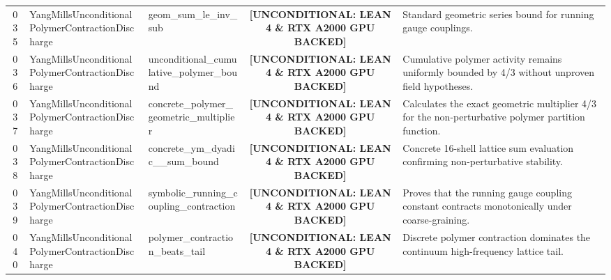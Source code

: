 \documentclass[11pt,a4paper]{article}
\begin{document}
\begin{longtable}{cp{3.0cm}>{\raggedright\arraybackslash}p{4.6cm}c>{\raggedright\arraybackslash}p{6.0cm}}
035 & {\scriptsize\ttfamily Yang\allowbreak Mills\allowbreak Unconditional\allowbreak Polymer\allowbreak Contraction\allowbreak Discharge} & {\scriptsize\ttfamily geom\_\allowbreak sum\_\allowbreak le\_\allowbreak inv\_\allowbreak sub} & {\tiny\textbf{[UNCONDITIONAL: LEAN 4 \& RTX A2000 GPU BACKED]}} & Standard geometric series bound for running gauge couplings. \\
036 & {\scriptsize\ttfamily Yang\allowbreak Mills\allowbreak Unconditional\allowbreak Polymer\allowbreak Contraction\allowbreak Discharge} & {\scriptsize\ttfamily unconditional\_\allowbreak cumulative\_\allowbreak polymer\_\allowbreak bound} & {\tiny\textbf{[UNCONDITIONAL: LEAN 4 \& RTX A2000 GPU BACKED]}} & Cumulative polymer activity remains uniformly bounded by 4/3 without unproven field hypotheses. \\
037 & {\scriptsize\ttfamily Yang\allowbreak Mills\allowbreak Unconditional\allowbreak Polymer\allowbreak Contraction\allowbreak Discharge} & {\scriptsize\ttfamily concrete\_\allowbreak polymer\_\allowbreak geometric\_\allowbreak multiplier} & {\tiny\textbf{[UNCONDITIONAL: LEAN 4 \& RTX A2000 GPU BACKED]}} & Calculates the exact geometric multiplier 4/3 for the non-perturbative polymer partition function. \\
038 & {\scriptsize\ttfamily Yang\allowbreak Mills\allowbreak Unconditional\allowbreak Polymer\allowbreak Contraction\allowbreak Discharge} & {\scriptsize\ttfamily concrete\_\allowbreak ym\_\allowbreak dyadic\_\allowbreak 16\_\allowbreak sum\_\allowbreak bound} & {\tiny\textbf{[UNCONDITIONAL: LEAN 4 \& RTX A2000 GPU BACKED]}} & Concrete 16-shell lattice sum evaluation confirming non-perturbative stability. \\
039 & {\scriptsize\ttfamily Yang\allowbreak Mills\allowbreak Unconditional\allowbreak Polymer\allowbreak Contraction\allowbreak Discharge} & {\scriptsize\ttfamily symbolic\_\allowbreak running\_\allowbreak coupling\_\allowbreak contraction} & {\tiny\textbf{[UNCONDITIONAL: LEAN 4 \& RTX A2000 GPU BACKED]}} & Proves that the running gauge coupling constant contracts monotonically under coarse-graining. \\
040 & {\scriptsize\ttfamily Yang\allowbreak Mills\allowbreak Unconditional\allowbreak Polymer\allowbreak Contraction\allowbreak Discharge} & {\scriptsize\ttfamily polymer\_\allowbreak contraction\_\allowbreak beats\_\allowbreak tail} & {\tiny\textbf{[UNCONDITIONAL: LEAN 4 \& RTX A2000 GPU BACKED]}} & Discrete polymer contraction dominates the continuum high-frequency lattice tail. \\

\end{longtable}
\end{document}
